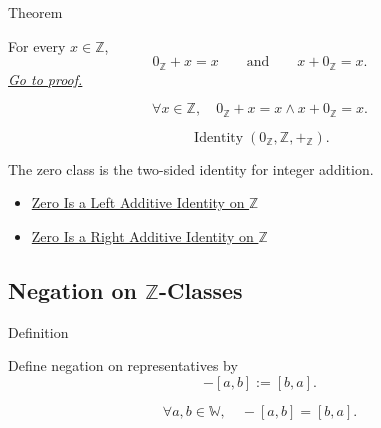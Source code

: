 \begin{theorembox}{Theorem}
\begin{theorem}
\label{thm:zero-additive-identity-on-z}
For every $x\in\mathbb{Z}$,
\[
0_{\mathbb{Z}}+x=x
\qquad\text{and}\qquad
x+0_{\mathbb{Z}}=x.
\]
\hyperref[prf:zero-additive-identity-on-z]{\textit{Go to proof.}}
\end{theorem}
\end{theorembox}

\begin{remark*}
\[
\forall x\in\mathbb{Z},\quad
0_{\mathbb{Z}}+x=x\land x+0_{\mathbb{Z}}=x.
\]
\end{remark*}

\begin{remark*}
\[
\operatorname{Identity}(0_{\mathbb{Z}},\mathbb{Z},+_{\mathbb{Z}}).
\]
\end{remark*}

\begin{remark*}[Interpretation]
The zero class is the two-sided identity for integer addition.
\end{remark*}

\begin{dependencies}
\begin{itemize}
  \item \hyperref[thm:zero-left-additive-identity-on-z]{Zero Is a Left Additive Identity on $\mathbb{Z}$}
  \item \hyperref[cor:zero-right-additive-identity-on-z]{Zero Is a Right Additive Identity on $\mathbb{Z}$}
\end{itemize}
\end{dependencies}

\subsection*{\texorpdfstring{Negation on $\mathbb{Z}$-Classes}{Negation on Z-Classes}}

\begin{definitionbox}{Definition}
\begin{definition}
\label{def:negation-on-z-classes}
Define negation on representatives by
\[
-[a,b]:=[b,a].
\]
\end{definition}
\end{definitionbox}

\begin{remark*}
\[
\forall a,b\in\mathbb{W},\quad -[a,b]=[b,a].
\]
\end{remark*}

